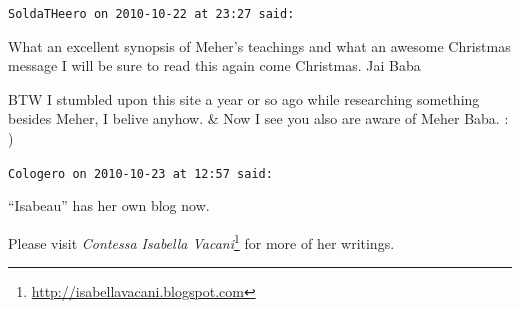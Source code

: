 \begin{footnotesize}
\begin{sffamily}
\texttt{SoldaTHeero on 2010-10-22 at 23:27 said:}

What an excellent synopsis of Meher's teachings and what an awesome Christmas message I will be sure to read this again come Christmas. Jai Baba

BTW I stumbled upon this site a year or so ago while researching something besides Meher, I belive anyhow. \& Now I see you also are aware of Meher Baba. : )

\hfill

\texttt{Cologero on 2010-10-23 at 12:57 said:}

``Isabeau'' has her own blog now.

Please visit \textit{Contessa Isabella Vacani}\footnote{\url{http://isabellavacani.blogspot.com}} for more of her writings.


\hfill

\end{sffamily}
\end{footnotesize}

